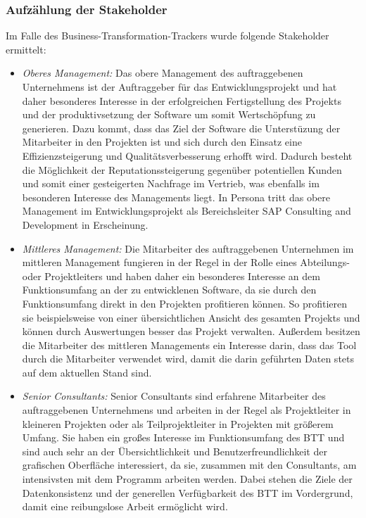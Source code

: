 \subsubsection{Aufzählung der Stakeholder}
Im Falle des Business-Transformation-Trackers wurde folgende Stakeholder ermittelt:
\begin{itemize}
    \item[] \emph{Oberes Management:} Das obere Management des auftraggebenen Unternehmens ist der Auftraggeber für das Entwicklungsprojekt und hat daher besonderes Interesse in der erfolgreichen Fertigstellung des Projekts und der produktivsetzung der Software um somit Wertschöpfung zu generieren. Dazu kommt, dass das Ziel der Software die Unterstüzung der Mitarbeiter in den Projekten ist und sich durch den Einsatz eine Effizienzsteigerung und Qualitätsverbesserung erhofft wird. Dadurch besteht die Möglichkeit der Reputationssteigerung gegenüber potentiellen Kunden und somit einer gesteigerten Nachfrage im Vertrieb, was ebenfalls im besonderen Interesse des Managements liegt. In Persona tritt das obere Management im Entwicklungsprojekt als Bereichsleiter \glqq{}SAP Consulting and Development\grqq{} in Erscheinung.
    \item[] \emph{Mittleres Management:} Die Mitarbeiter des auftraggebenen Unternehmen im mittleren Management fungieren in der Regel in der Rolle eines Abteilungs- oder Projektleiters und haben daher ein besonderes Interesse an dem Funktionsumfang an der zu entwicklenen Software, da sie durch den Funktionsumfang direkt in den Projekten profitieren können. So profitieren sie beispielsweise von einer übersichtlichen Ansicht des gesamten Projekts und können durch Auswertungen besser das Projekt verwalten. Außerdem besitzen die Mitarbeiter des mittleren Managements ein Interesse darin, dass das Tool durch die Mitarbeiter verwendet wird, damit die darin geführten Daten stets auf dem aktuellen Stand sind. 
    \item[] \emph{Senior Consultants:} Senior Consultants sind erfahrene Mitarbeiter des auftraggebenen Unternehmens und arbeiten in der Regel als Projektleiter in kleineren Projekten oder als Teilprojektleiter in Projekten mit größerem Umfang. Sie haben ein großes Interesse im Funktionsumfang des BTT und sind auch sehr an der Übersichtlichkeit und Benutzerfreundlichkeit der grafischen Oberfläche interessiert, da sie, zusammen mit den Consultants, am intensivsten mit dem Programm arbeiten werden. Dabei stehen die Ziele der Datenkonsistenz und der generellen Verfügbarkeit des BTT im Vordergrund, damit eine reibungslose Arbeit ermöglicht wird.

\end{itemize}
